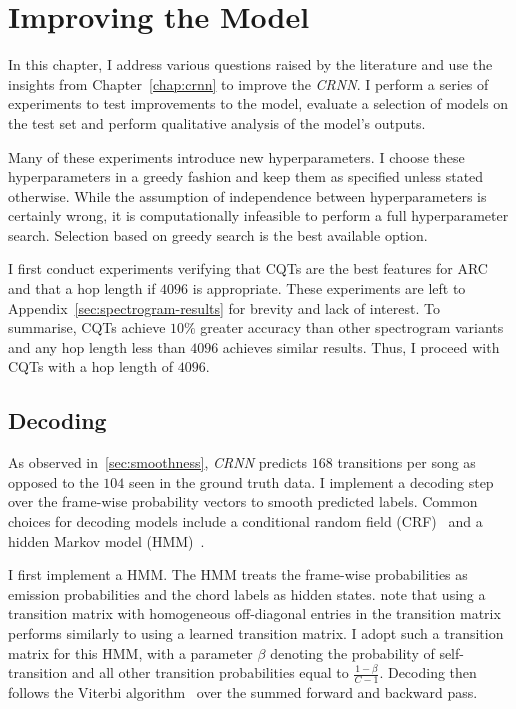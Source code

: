 \chapter{Improving the Model}\label{chap:model_improvements}

In this chapter, I address various questions raised by the literature and use the insights from Chapter~\ref{chap:crnn} to improve the \emph{CRNN}. I perform a series of experiments to test improvements to the model, evaluate a selection of models on the test set and perform qualitative analysis of the model's outputs.

Many of these experiments introduce new hyperparameters. I choose these hyperparameters in a greedy fashion and keep them as specified unless stated otherwise. While the assumption of independence between hyperparameters is certainly wrong, it is computationally infeasible to perform a full hyperparameter search. Selection based on greedy search is the best available option.

I first conduct experiments verifying that CQTs are the best features for ARC and that a hop length if $4096$ is appropriate. These experiments are left to Appendix~\ref{sec:spectrogram-results} for brevity and lack of interest. To summarise, CQTs achieve $10\%$ greater accuracy than other spectrogram variants and any hop length less than $4096$ achieves similar results. Thus, I proceed with CQTs with a hop length of $4096$.

\section{Decoding}\label{sec:decoding}

As observed in~\ref{sec:smoothness}, \emph{CRNN} predicts $168$ transitions per song as opposed to the $104$ seen in the ground truth data. I implement a decoding step over the frame-wise probability vectors to smooth predicted labels. Common choices for decoding models include a conditional random field (CRF)~\citep{ACRLargeVocab1, BTC} and a hidden Markov model (HMM)~\citep{BalanceRandomForestACR}. 

I first implement a HMM. The HMM treats the frame-wise probabilities as emission probabilities and the chord labels as hidden states. \citet{CQTvsChroma} note that using a transition matrix with homogeneous off-diagonal entries in the transition matrix performs similarly to using a learned transition matrix. I adopt such a transition matrix for this HMM, with a parameter $\beta$ denoting the probability of self-transition and all other transition probabilities equal to $\frac{1-\beta}{C-1}$. Decoding then follows the Viterbi algorithm~\citep{Viterbi} over the summed forward and backward pass.

